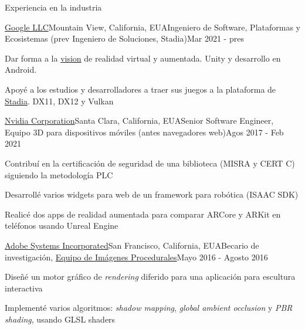 \documentclass{resume} %
\begin{document}

\begin{rSection}{Experiencia en la industria}

\begin{rSubsection}{\href{http://about.google/}{Google LLC}}{Mountain View, California, EUA}{Ingeniero de Software, Plataformas y Ecosistemas (prev Ingeniero de Soluciones, Stadia)}{Mar 2021 - pres}
\item Dar forma a la \href{https://arvr.google.com/}{vision} de realidad virtual y aumentada. Unity y desarrollo en Android.
\item Apoyé a los estudios y desarrolladores a traer sus juegos a la plataforma de \href{http://stadia.google.com/}{Stadia}. DX11, DX12 y Vulkan
\end{rSubsection}

\begin{rSubsection}{\href{http://www.nvidia.com}{Nvidia Corporation}}{Santa Clara, California, EUA}{Senior Software Engineer, Equipo 3D para dispositivos móviles (antes navegadores web)}{Agos 2017 - Feb 2021}
\item Contribuí en la certificación de seguridad de una biblioteca (MISRA y CERT C) siguiendo la metodología PLC
\item Desarrollé varios widgets para web de un framework para robótica (ISAAC SDK)
\item Realicé dos apps de realidad aumentada para comparar ARCore y ARKit en teléfonos usando Unreal Engine
\end{rSubsection}

\begin{rSubsection}{\href{http://www.adobe.com/}{Adobe Systems Incorporated}}{San Francisco, California, EUA}{Becario de investigación, \href{http://research.adobe.com/}{Equipo de Imágenes Procedurales}}{Mayo 2016 - Agosto 2016}
\item Diseñé un motor gráfico de \emph{rendering} diferido para una aplicación para escultura interactiva
\item Implementé varios algoritmos: \emph{shadow mapping}, \emph{global ambient occlusion} y \emph{PBR shading}, usando GLSL shaders
\end{rSubsection}


\end{rSection}
\end{document}
